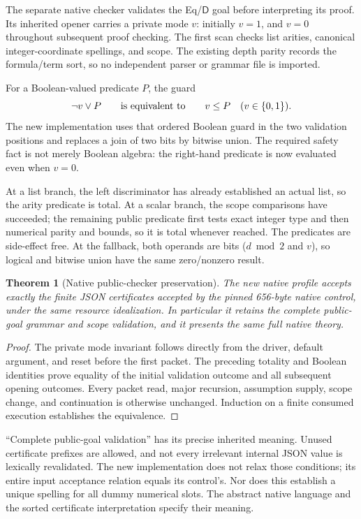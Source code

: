 \documentclass[11pt,letterpaper]{article}
\newtheorem{theorem}{Theorem}[section]
\theoremstyle{definition}
\newcommand{\D}{\mathsf D}
\begin{document}
The separate native checker validates the Eq/$\D$ goal before interpreting
its proof. Its inherited opener carries a private mode $v$: initially
$v=1$, and $v=0$ throughout subsequent proof checking. The first scan
checks list arities, canonical integer-coordinate spellings, and scope.
The existing depth parity records the formula/term sort, so no independent
parser or grammar file is imported.

For a Boolean-valued predicate $P$, the guard
\[
            \neg v\lor P\qquad\hbox{is equivalent to}\qquad v\le P
            \quad(v\in\{0,1\}).
\]
The new implementation uses that ordered Boolean guard in the two
validation positions and replaces a join of two bits by bitwise union.
The required safety fact is not merely Boolean algebra: the right-hand
predicate is now evaluated even when $v=0$.

At a list branch, the left discriminator has already established an
actual list, so the arity predicate is total. At a scalar branch, the
scope comparisons have succeeded; the remaining public predicate first
tests exact integer type and then numerical parity and bounds, so it is
total whenever reached. The predicates are side-effect free. At the
fallback, both operands are bits ($d\bmod2$ and $v$), so logical and
bitwise union have the same zero/nonzero result.

\begin{theorem}[Native public-checker preservation]
The new native profile accepts exactly the finite JSON certificates
accepted by the pinned 656-byte native control, under the same resource
idealization. In particular it retains the complete public-goal grammar
and scope validation, and it presents the same full native theory.
\end{theorem}
\begin{proof}
The private mode invariant follows directly from the driver, default
argument, and reset before the first packet. The preceding totality and
Boolean identities prove equality of the initial validation outcome and
all subsequent opening outcomes. Every packet read, major recursion,
assumption supply, scope change, and continuation is otherwise unchanged.
Induction on a finite consumed execution establishes the equivalence.
\end{proof}

``Complete public-goal validation'' has its precise inherited meaning.
Unused certificate prefixes are allowed, and not every irrelevant
internal JSON value is lexically revalidated. The new implementation
does not relax those conditions; its entire input acceptance relation
equals its control's. Nor does this establish a unique spelling for all
dummy numerical slots. The abstract native language and the sorted
certificate interpretation specify their meaning.
\end{document}
